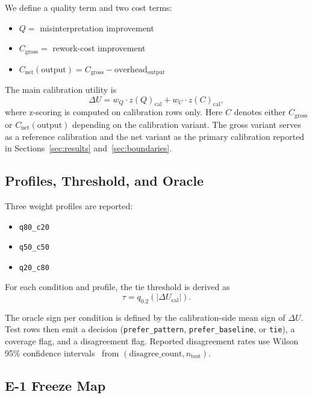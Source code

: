 \documentclass[11pt,a4paper]{article}
\begin{document}
We define a quality term and two cost terms:
\begin{itemize}
  \item $Q =$ misinterpretation improvement
  \item $C_{\mathrm{gross}} =$ rework-cost improvement
  \item $C_{\mathrm{net}}(\mathrm{output}) = C_{\mathrm{gross}} - \mathrm{overhead}_{\mathrm{output}}$
\end{itemize}

The main calibration utility is
\[
\Delta U = w_Q \cdot z(Q)_{\mathrm{cal}} + w_C \cdot z(C)_{\mathrm{cal}},
\]
where z-scoring is computed on calibration rows only.
Here $C$ denotes either $C_{\mathrm{gross}}$ or $C_{\mathrm{net}}(\mathrm{output})$ depending on the calibration variant.
The gross variant serves as a reference calibration and the net variant as the primary calibration reported in Sections~\ref{sec:results} and~\ref{sec:boundaries}.

\subsection{Profiles, Threshold, and Oracle}
\label{sec:profiles}

Three weight profiles are reported:
\begin{itemize}
  \item \texttt{q80\_c20}
  \item \texttt{q50\_c50}
  \item \texttt{q20\_c80}
\end{itemize}

For each condition and profile, the tie threshold is derived as
\[
\tau = q_{0.2}\left(|\Delta U_{\mathrm{cal}}|\right).
\]

The oracle sign per condition is defined by the calibration-side mean sign of $\Delta U$. Test rows then emit a decision (\texttt{prefer\_pattern}, \texttt{prefer\_baseline}, or \texttt{tie}), a coverage flag, and a disagreement flag. Reported disagreement rates use Wilson 95\% confidence intervals~\cite{wilson1927} from $(\mathrm{disagree\_count}, n_{\mathrm{test}})$.

\subsection{E-1 Freeze Map}
\end{document}
